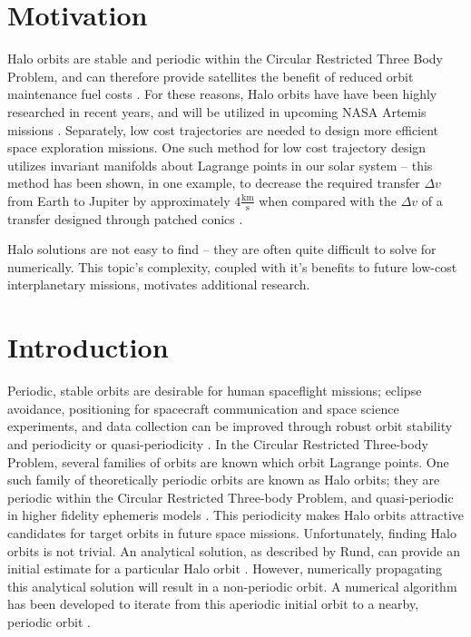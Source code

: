 \documentclass[conf]{new-aiaa}
\begin{document}
\begin{multicols}{2}

\tableofcontents

\section{Motivation}
Halo orbits are stable and periodic
within the Circular Restricted Three Body 
Problem, and can therefore provide satellites the benefit 
of reduced orbit maintenance fuel costs \cite{williams2017targeting}.
For these reasons, Halo orbits have have been
highly researched in recent 
years, and will be utilized in upcoming NASA Artemis missions
\cite{nasa2020artemis}. Separately, low cost trajectories 
are needed to design more efficient space exploration missions.
One such method for low cost trajectory design utilizes 
invariant manifolds about Lagrange points in our solar system --
this method has been shown, in one example, to 
decrease the required transfer $\Delta v$ from
Earth to Jupiter by approximately
$4 \frac{\text{km}}{\text{s}}$ when compared with the $\Delta v$ of a transfer
designed through patched conics \cite{rund2018interplanetary}. 

Halo solutions are not easy to find -- they are often quite
difficult to solve for numerically. 
This topic's complexity, coupled
with it's benefits to future low-cost interplanetary missions,
motivates additional research. 

\section{Introduction}
Periodic, stable orbits are desirable for human spaceflight missions;
eclipse avoidance, positioning for spacecraft communication and space 
science experiments, and data collection can be 
improved through robust orbit stability and periodicity or 
quasi-periodicity \cite{zimovan2020near}. In the Circular Restricted 
Three-body Problem, several families of orbits are known which 
orbit Lagrange points. One such
family of theoretically periodic orbits are 
known as Halo orbits; they are periodic
within the Circular Restricted Three-body Problem, and
quasi-periodic in higher fidelity ephemeris models
\cite{zimovan2020near} \cite{rund2018interplanetary}. This 
periodicity makes Halo orbits attractive candidates for target 
orbits in future space missions. Unfortunately, finding 
Halo orbits is not trivial. An analytical solution, as 
described by Rund, can provide an initial estimate
for a particular Halo orbit \cite{rund2018interplanetary}. However,
numerically propagating this analytical solution will result in 
a non-periodic orbit. A numerical algorithm has been developed to 
iterate from this aperiodic initial orbit to a nearby, periodic orbit 
\cite{rund2018interplanetary} \cite{howell1984three}.


\end{multicols}
\end{document}
